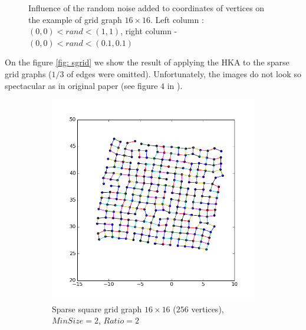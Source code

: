 \documentclass[12pt,a4paper]{article}
\begin{document}
\begin{figure}
\caption{Influence of the random noise added to coordinates of vertices on the example of grid graph $16\times16$. Left column : $(0,0)<rand<(1,1)$, right column - $(0,0)<rand<(0.1,0.1)$}
\label{fig: compareRand}
\end{figure}	

\FloatBarrier

On the figure \ref{fig: sgrid} we show the result of applying the HKA to the sparse grid graphs ($1/3$ of edges were omitted). Unfortunately, the images do not look so spectacular as in original paper (see figure $4$ in \cite{DavidHarel2002}).
\begin{figure}[htb]
	 \begin{subfigure}{0.5\textwidth}
		   \centering
           \includegraphics[scale=0.45]{results_Harel/HK_sgrid16x16_m2r2.png}
           \caption{Sparse square grid graph $16\times 16$ ($256$ vertices), $MinSize=2$, $Ratio=2$}
     \end{subfigure}
	 \begin{subfigure}{0.5\textwidth}
			\centering

\end{subfigure}
\end{figure}
\end{document}
